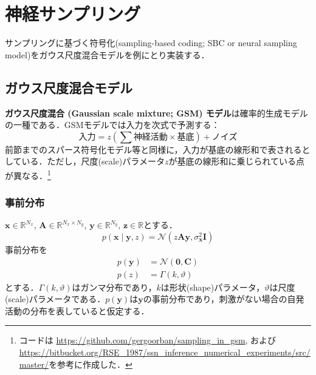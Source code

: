 \section{神経サンプリング}
サンプリングに基づく符号化(sampling-based coding; SBC or neural sampling model)をガウス尺度混合モデルを例にとり実装する．
\subsection{ガウス尺度混合モデル}
\textbf{ガウス尺度混合 (Gaussian scale mixture; GSM) モデル}は確率的生成モデルの一種である\citep{Wainwright1999-cl}\citep{Orban2016-tm}．GSMモデルでは入力を次式で予測する：
\begin{equation}
\text{入力}={z}\left(\sum \text{神経活動} \times \text{基底} \right) + \text{ノイズ}
\end{equation}
前節までのスパース符号化モデル等と同様に，入力が基底の線形和で表されるとしている．ただし，尺度(scale)パラメータ$z$が基底の線形和に乗じられている点が異なる．\footnote{コードは\citep{Orban2016-tm} \url{https://github.com/gergoorban/sampling_in_gsm}, および\citep{Echeveste2020-sh} \url{https://bitbucket.org/RSE_1987/ssn_inference_numerical_experiments/src/master/}を参考に作成した．}
\subsubsection{事前分布}
$\mathbf{x} \in \mathbb{R}^{N_x}$, $\mathbf{A} \in \mathbb{R}^{N_x\times N_y}$, $\mathbf{y} \in \mathbb{R}^{N_y}$, $\mathbf{z} \in \mathbb{R}$とする．
\begin{equation}
p\left(\mathbf{x}\mid\mathbf{y}, z\right)=\mathcal{N}\left(z \mathbf{A} \mathbf{y}, \sigma_{\mathbf{x}}^{2} \mathbf{I}\right)
\end{equation}
事前分布を
\begin{align}
p\left(\mathbf{y}\right)&=\mathcal{N}\left(\mathbf{0}, \mathbf{C}\right)\\
p\left(z\right)&=\Gamma (k, \vartheta)
\end{align}
とする．$\Gamma(k, \vartheta)$はガンマ分布であり，$k$は形状(shape)パラメータ，$\vartheta$は尺度(scale)パラメータである．$p\left(\mathbf{y}\right)$は$\mathbf{y}$の事前分布であり，刺激がない場合の自発活動の分布を表していると仮定する．
